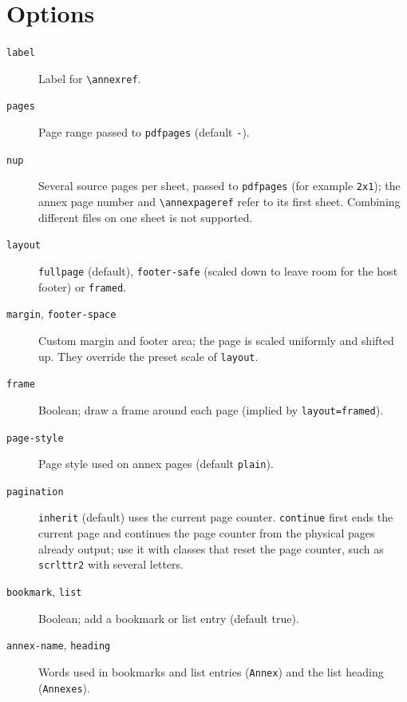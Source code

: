 \documentclass{article}
\begin{document}
\section{Options}

\begin{description}
\item[\texttt{label}] Label for \verb|\annexref|.
\item[\texttt{pages}] Page range passed to \texttt{pdfpages} (default \texttt{-}).
\item[\texttt{nup}] Several source pages per sheet, passed to \texttt{pdfpages} (for example \texttt{2x1}); the annex page number and \verb|\annexpageref| refer to its first sheet. Combining different files on one sheet is not supported.
\item[\texttt{layout}] \texttt{fullpage} (default), \texttt{footer-safe}
  (scaled down to leave room for the host footer) or \texttt{framed}.
\item[\texttt{margin}, \texttt{footer-space}] Custom margin and footer area;
  the page is scaled uniformly and shifted up. They override the preset
  scale of \texttt{layout}.
\item[\texttt{frame}] Boolean; draw a frame around each page (implied by \texttt{layout=framed}).
\item[\texttt{page-style}] Page style used on annex pages (default \texttt{plain}).
\item[\texttt{pagination}] \texttt{inherit} (default) uses the current page
  counter. \texttt{continue} first ends the current page and continues the page
  counter from the physical pages already output; use it with classes that reset
  the page counter, such as \texttt{scrlttr2} with several letters.
\item[\texttt{bookmark}, \texttt{list}] Boolean; add a bookmark or list entry (default true).
\item[\texttt{annex-name}, \texttt{heading}] Words used in bookmarks and
  list entries (\texttt{Annex}) and the list heading (\texttt{Annexes}).
\end{description}
\end{document}
